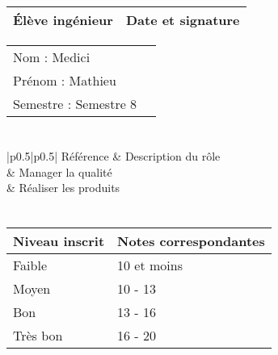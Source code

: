 \documentclass[11pt]{article}
\begin{document}

\begin{center}
\begin{table}[!hp]

	\begin{tabularx}{\linewidth}{|X|X|}
	\hline
	\rowcolor{gray!40} Élève ingénieur & Date et signature \\
	\hline
	\end{tabularx}
	\begin{tabularx}{\linewidth}{|X|X|}
	Nom : Medici &  \\ 
	Prénom : Mathieu & \\
	Semestre : Semestre 8 & \\
	\hline
	\end{tabularx}
\end{table}
\end{center}

\section*{\large\FR}

\centering
	\begin{longtable}{|p{0.5\textwidth}|p{0.5\textwidth}|}
	\hline
	 Référence \WBSCourt & Description du rôle \\
	 & Manager la qualité \\
	 & Réaliser les produits \\
	 \hline
	\end{longtable}


\section*{\large\FC}


\begin{table}[!hp]
\centering
	\begin{tabularx}{\linewidth}{|X|X|}
	\hline
	\rowcolor{gray!40} Niveau inscrit & Notes correspondantes \\
	\hline
	 Faible & 10 et moins \\
	 \hline
	 Moyen & 10 - 13 \\
	 \hline
	 Bon & 13 - 16 \\
	 \hline
	 Très bon & 16 - 20 \\
	 \hline
	\end{tabularx}
\end{table}
\end{document}
